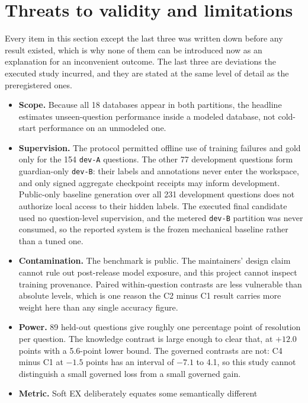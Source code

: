 \section{Threats to validity and limitations}
\label{sec:threats}

Every item in this section except the last three was written down before any
result existed, which is why none of them can be introduced now as an explanation
for an inconvenient outcome. The last three are deviations the executed study
incurred, and they are stated at the same level of detail as the preregistered
ones.

\begin{itemize}[leftmargin=1.2em]
  \item \textbf{Scope.} Because all 18 databases appear in both partitions, the
  headline estimates unseen-question performance inside a modeled database, not
  cold-start performance on an unmodeled one.
  \item \textbf{Supervision.} The protocol permitted offline use of training
  failures and gold only for the 154 \texttt{dev-A} questions. The other 77
  development questions form guardian-only \texttt{dev-B}: their labels and
  annotations never enter the workspace, and only signed aggregate checkpoint
  receipts may inform development. Public-only baseline generation over all 231
  development questions does not authorize local access to their hidden labels.
  The executed final candidate used no question-level supervision, and the
  metered \texttt{dev-B} partition was never consumed, so the reported system is
  the frozen mechanical baseline rather than a tuned one.
  \item \textbf{Contamination.} The benchmark is public. The maintainers' design
  claim cannot rule out post-release model exposure, and this project cannot
  inspect training provenance. Paired within-question contrasts are less
  vulnerable than absolute levels, which is one reason the C2 minus C1 result
  carries more weight here than any single accuracy figure.
  \item \textbf{Power.} 89 held-out questions give roughly one percentage point
  of resolution per question. The knowledge contrast is large enough to clear
  that, at $+12.0$ points with a 5.6-point lower bound. The governed contrasts
  are not: C4 minus C1 at $-1.5$ points has an interval of $-7.1$ to 4.1, so this
  study cannot distinguish a small governed loss from a small governed gain.
  \item \textbf{Metric.} Soft EX deliberately equates some semantically different

\end{itemize}

